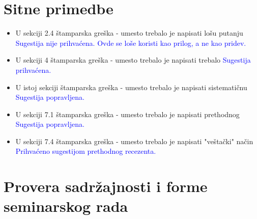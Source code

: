 \documentclass[a4paper]{report}
\newcommand{\odgovor}[1]{\textcolor{blue}{#1}}
\begin{document}
\section{Sitne primedbe}
\begin{itemize}
	\item  U sekciji 2.4 štamparska greška - umesto  trebalo je napisati lošu putanju
	\odgovor{Sugestija nije prihvaćena. Ovde se loše koristi kao prilog, a ne kao pridev.}
	\item  U sekciji 4 štamparska greška - umesto  trebalo je napisati trebalo
	\odgovor{Sugestija prihvaćena.}
	\item  U istoj sekciji štamparska greška - umesto  trebalo je napisati sistematičnu
	\odgovor{Sugestija popravljena.}
	\item  U sekciji 7.1 štamparska greška - umesto  trebalo je napisati prethodnog
	\odgovor{Sugestija popravljena.}
	\item  U sekciji 7.4 štamparska greška - umesto  trebalo je napisati "veštački" način
	\odgovor{Prihvaćeno sugestijom prethodnog recezenta.}
\end{itemize}

\section{Provera sadržajnosti i forme seminarskog rada}
\end{document}
